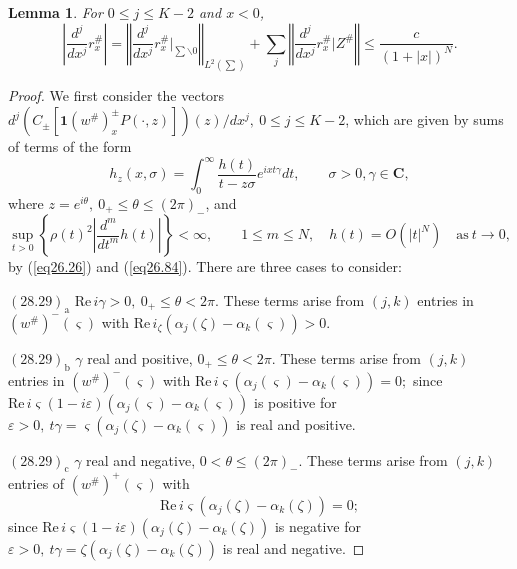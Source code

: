 \documentclass{surv-l}
\theoremstyle{plain}
\newtheorem{lem}[theorem]{\sc Lemma}
\theoremstyle{definition}
\numberwithin{equation}{chapter}
\begin{document}
\setcounter{theorem}{25}
\begin{lem}\label{lem28.26} For $0\leq j\leq K-2$ and $x<0$,
\setcounter{equation}{26}
\begin{equation}\label{eq28.27}
\left|\frac{d^{j}}{d{x^{j}}}r_{x}^{\#}\right|=\left\Vert\frac{d^{j}}{d{x^{j}}}r_{x}^{\#}\Big|_{\sum\backslash 0}\right\Vert_{L^{2}(\sum)}+\sum_{j}\left\Vert\frac{d^{j}}{dx^{j}}r_{x}^{\#}\Big|Z^{\#}\right\Vert\leq\frac{c}{(1+|x|)^{N}}.
\end{equation}
\end{lem}

\begin{proof} We first consider the vectors $d^{j}(C_{\pm}[\mathbf{1}(w^{\#})_{x}^{\pm}P(\cdot,z)]) (z)/dx^{j},\  0\leq j\leq K-2$, which are given by sums of terms of the form
\begin{equation*}
h_{z}(x,\sigma)=\int_{0}^{\infty}\frac{h(t)}{t-z\sigma}e^{ixt\gamma}dt,\qquad \sigma>0,\gamma\in \mathbf{C},
\end{equation*}
where $z=e^{i\theta},\ 0_{+}\leq\theta\leq(2\pi)_{-}$, and
\begin{equation}
\sup_{t>0}\left\{\rho(t)^{2}\left|\frac{d^{m}}{dt^{m}}h(t)\right|\right\}<\infty,\qquad 1\leq m\leq N,\quad h(t)=O(|t|^{N})\quad \mathrm{as}\ t\rightarrow 0,
\end{equation}
by (\ref{eq26.26}) and (\ref{eq26.84}). There are three cases to consider:

$(28.29)_{\mathrm{a}}$ $\mathrm{Re}\, i\gamma>0,\  0_{+}\leq\theta<2\pi$. These terms arise from $(j, k)$ entries in $(w^{\#})^{-}(\varsigma)$ with $\mathrm{Re}\,i_{\zeta}(\alpha_{j}(\zeta)-\alpha_{k}(\varsigma))>0$.

$(28.29)_{\mathrm{b}}$ $\gamma$ real and positive, $0_{+}\leq\theta<2\pi$. These terms arise from $(j, k)$ entries in $(w^{\#})^{-}(\varsigma)$ with $\mathrm{Re}\, i{\varsigma}(\alpha_{j}(\varsigma)-\alpha_{k}(\varsigma))=0;$ since $\mathrm{Re}\, i{\varsigma}(1-i\varepsilon) (\alpha_{j}(\varsigma)-\alpha_{k}(\varsigma))$ is positive for $\varepsilon >0,\ t\gamma=\varsigma(\alpha_{j}(\zeta)-\alpha_{k}(\varsigma))$ is real and positive.

$(28.29)_{\mathrm{c}}$  $\gamma$ real and negative, $ 0<\theta\leq(2\pi)_{-}$. These terms arise from $(j, k)$ entries of $(w^{\#})^{+}(\varsigma)$ with
\begin{equation*}
\mathrm{Re}\, i{\varsigma}(\alpha_{j}(\zeta)-\alpha_{k}(\zeta))=0;
\end{equation*}
since $\mathrm{Re}\, i{\varsigma}(1-i\varepsilon)(\alpha_{j}(\zeta)-\alpha_{k}(\zeta))$ is negative for $\varepsilon >0,\ t\gamma=\zeta(\alpha_{j}(\zeta)-\alpha_{k}(\zeta))$ is real and negative.


\end{proof}
\end{document}
